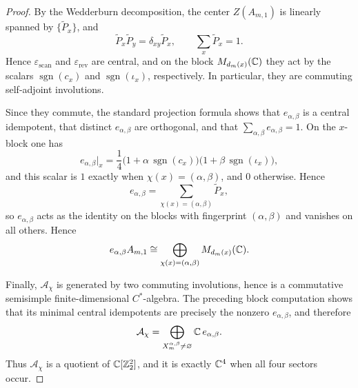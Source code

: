 \begin{proof}
By the Wedderburn decomposition, the center \(Z(A_{m,1})\) is linearly spanned by \(\{\widetilde P_x\}\), and
\[
\widetilde P_x\widetilde P_y=\delta_{xy}\widetilde P_x,
\qquad
\sum_x\widetilde P_x=1.
\]
Hence \(\varepsilon_{\mathrm{scan}}\) and \(\varepsilon_{\mathrm{rev}}\) are central, and on the block \(M_{d_m(x)}(\mathbb{C})\) they act by the scalars \(\operatorname{sgn}(c_x)\) and \(\operatorname{sgn}(\iota_x)\), respectively. In particular, they are commuting self-adjoint involutions.

Since they commute, the standard projection formula shows that \(e_{\alpha,\beta}\) is a central idempotent, that distinct \(e_{\alpha,\beta}\) are orthogonal, and that \(\sum_{\alpha,\beta}e_{\alpha,\beta}=1\). On the \(x\)-block one has
\[
e_{\alpha,\beta}\Big|_x
=
\frac14\bigl(1+\alpha\,\operatorname{sgn}(c_x)\bigr)\bigl(1+\beta\,\operatorname{sgn}(\iota_x)\bigr),
\]
and this scalar is \(1\) exactly when \(\chi(x)=(\alpha,\beta)\), and \(0\) otherwise.
Hence
\[
e_{\alpha,\beta}=\sum_{\chi(x)=(\alpha,\beta)}\widetilde P_x,
\]
so \(e_{\alpha,\beta}\) acts as the identity on the blocks with fingerprint \((\alpha,\beta)\) and vanishes on all others. Hence
\[
e_{\alpha,\beta}A_{m,1}
\cong
\bigoplus_{\chi(x)=(\alpha,\beta)}M_{d_m(x)}(\mathbb{C}).
\]

Finally, \(\mathcal A_\chi\) is generated by two commuting involutions, hence is a commutative semisimple finite-dimensional \(C^\ast\)-algebra. The preceding block computation shows that its minimal central idempotents are precisely the nonzero \(e_{\alpha,\beta}\), and therefore
\[
\mathcal A_\chi=\bigoplus_{X_m^{\alpha,\beta}\neq\varnothing}\mathbb{C}\,e_{\alpha,\beta}.
\]
Thus \(\mathcal A_\chi\) is a quotient of \(\mathbb{C}[\mathbb Z_2^2]\), and it is exactly \(\mathbb{C}^4\) when all four sectors occur.
\end{proof}

